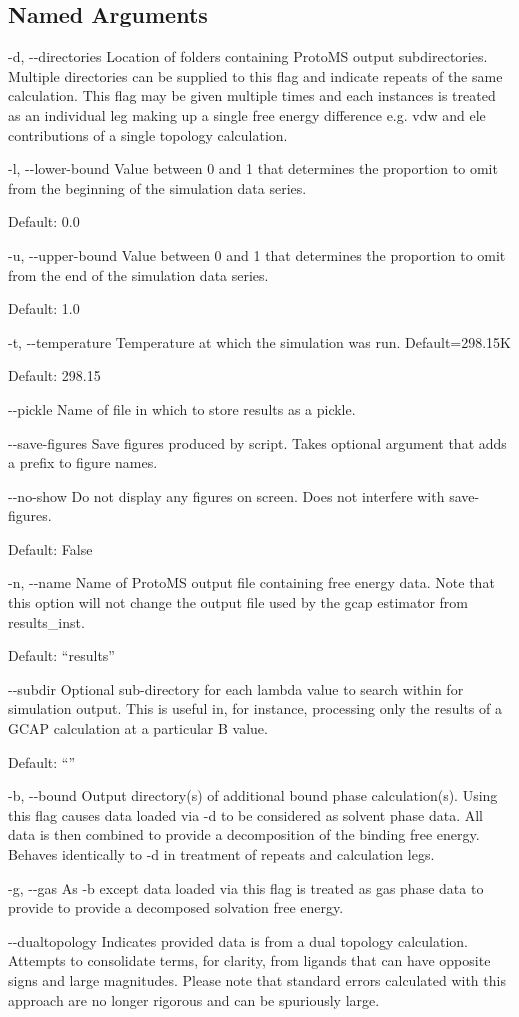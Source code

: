 \documentclass[letterpaper,10pt,english]{sphinxmanual}
\begin{document}
\subsection{Named Arguments}
\label{\detokenize{tools:Named Arguments}}\begin{optionlist}{3cm}
\item [-d, -{-}directories]  
Location of folders containing ProtoMS output subdirectories. Multiple directories can be supplied to this flag and indicate repeats of the same calculation. This flag may be given multiple times and each instances is treated as an individual leg making up a single free energy difference e.g. vdw and ele contributions of a single topology calculation.
\item [-l, -{-}lower-bound]  
Value between 0 and 1 that determines the proportion to omit from the beginning of the simulation data series.

Default: 0.0
\item [-u, -{-}upper-bound]  
Value between 0 and 1 that determines the proportion to omit from the end of the simulation data series.

Default: 1.0
\item [-t, -{-}temperature]  
Temperature at which the simulation was run. Default=298.15K

Default: 298.15
\item [-{-}pickle]  
Name of file in which to store results as a pickle.
\item [-{-}save-figures]  
Save figures produced by script. Takes optional argument that adds a prefix to figure names.
\item [-{-}no-show]  
Do not display any figures on screen. Does not interfere with \textendash{}save-figures.

Default: False
\item [-n, -{-}name]  
Name of ProtoMS output file containing free energy data. Note that this option will not change the output file used by the gcap estimator from results\_inst.

Default: “results”
\item [-{-}subdir]  
Optional sub-directory for each lambda value to search within for simulation output. This is useful in, for instance, processing only the results of a GCAP calculation at a particular B value.

Default: “”
\item [-b, -{-}bound]  
Output directory(s) of additional bound phase calculation(s). Using this flag causes data loaded via -d to be considered as solvent phase data. All data is then combined to provide a decomposition of the binding free energy. Behaves identically to -d in treatment of repeats and calculation legs.
\item [-g, -{-}gas]  
As -b except data loaded via this flag is treated as gas phase data to provide to provide a decomposed solvation free energy.
\item [-{-}dualtopology]  
Indicates provided data is from a dual topology calculation. Attempts to consolidate terms, for clarity, from ligands that can have opposite signs and large magnitudes. Please note that standard errors calculated with this approach are no longer rigorous and can be spuriously large.


\end{optionlist}
\end{document}
